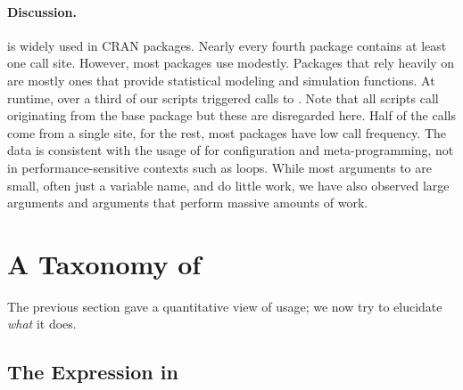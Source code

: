 \documentclass[acmsmall, screen]{acmart}
\begin{document}
\paragraph{Discussion.}
\Eval is widely used in CRAN packages. Nearly every fourth package contains at
least one \eval call site. However, most packages use \eval modestly. Packages
that rely heavily on \eval are mostly ones that provide statistical modeling and
simulation functions. At runtime, over a third of our scripts triggered calls to
\eval. Note that all scripts call \eval originating from the base package but
these are disregarded here. Half of the calls come from a single site, for the
rest, most packages have low call frequency. The data is consistent with the usage
of \eval for configuration and meta-programming, not in performance-sensitive
contexts such as loops. While most arguments to \eval are small, often just a
variable name, and do little work, we have also observed large arguments
and arguments that perform massive amounts of work.

\section{A Taxonomy of \Eval}

The previous section gave a quantitative view of \eval usage; we now try to
elucidate \emph{what} it does.

\subsection{The Expression in \Eval} \label{sec:minimized}
\end{document}
